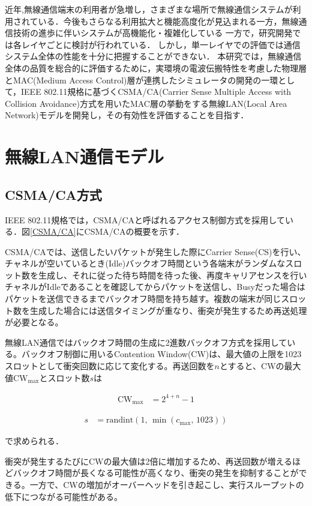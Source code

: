 \documentclass[a4paper, 10pt]{ltjsarticle}
\begin{document}
近年,無線通信端末の利用者が急増し，さまざまな場所で無線通信システムが利用されている．今後もさらなる利用拡大と機能高度化が見込まれる一方，無線通信技術の進歩に伴いシステムが高機能化・複雑化している
一方で，研究開発では各レイヤごとに検討が行われている．
しかし，単一レイヤでの評価では通信システム全体の性能を十分に把握することができない．
本研究では，無線通信全体の品質を総合的に評価するために，実環境の電波伝搬特性を考慮した物理層とMAC(Medium Access Control)層が連携したシミュレータの開発の一環として，IEEE 802.11規格に基づくCSMA/CA(Carrier Sense Multiple Access with Collision Avoidance)方式を用いたMAC層の挙動をする無線LAN(Local Area Network)モデルを開発し，その有効性を評価することを目指す．


\section{無線LAN通信モデル}


\subsection{CSMA/CA方式}

IEEE 802.11規格では，CSMA/CAと呼ばれるアクセス制御方式を採用している．図\ref{CSMA/CA}にCSMA/CAの概要を示す．


CSMA/CAでは、送信したいパケットが発生した際にCarrier Sense(CS)を行い、チャネルが空いているとき(Idle)バックオフ時間という各端末がランダムなスロット数を生成し、それに従った待ち時間を待った後、再度キャリアセンスを行いチャネルがIdleであることを確認してからパケットを送信し、Busyだった場合はパケットを送信できるまでバックオフ時間を持ち越す。複数の端末が同じスロット数を生成した場合には送信タイミングが重なり、衝突が発生するため再送処理が必要となる。

無線LAN通信ではバックオフ時間の生成に2進数バックオフ方式を採用している。バックオフ制御に用いるContention Window(CW)は、最大値の上限を1023スロットとして衝突回数に応じて変化する。再送回数を$n$とすると、CWの最大値$\mathrm{CW}_{\max}$とスロット数$s$は


\begin{align}
  \mathrm{CW}_{\max} &= 2^{4 + n} - 1
\end{align}

\begin{align}
  s &= \mathrm{randint}(1, \, \min(c_{\max}, \, 1023))
  \label{slot}
\end{align}

で求められる．

衝突が発生するたびにCWの最大値は2倍に増加するため、再送回数が増えるほどバックオフ時間が長くなる可能性が高くなり、衝突の発生を抑制することができる。一方で、CWの増加がオーバーヘッドを引き起こし、実行スループットの低下につながる可能性がある。
\end{document}
